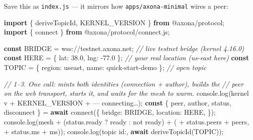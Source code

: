 \documentclass[
  nobib]{tufte-handout}
\newenvironment{Shaded}{}{}
\newcommand{\AttributeTok}[1]{\textcolor[rgb]{0.49,0.56,0.16}{#1}}
\newcommand{\BuiltInTok}[1]{\textcolor[rgb]{0.00,0.50,0.00}{#1}}
\newcommand{\CommentTok}[1]{\textcolor[rgb]{0.38,0.63,0.69}{\textit{#1}}}
\newcommand{\ControlFlowTok}[1]{\textcolor[rgb]{0.00,0.44,0.13}{\textbf{#1}}}
\newcommand{\DataTypeTok}[1]{\textcolor[rgb]{0.56,0.13,0.00}{#1}}
\newcommand{\FloatTok}[1]{\textcolor[rgb]{0.25,0.63,0.44}{#1}}
\newcommand{\FunctionTok}[1]{\textcolor[rgb]{0.02,0.16,0.49}{#1}}
\newcommand{\ImportTok}[1]{\textcolor[rgb]{0.00,0.50,0.00}{\textbf{#1}}}
\newcommand{\KeywordTok}[1]{\textcolor[rgb]{0.00,0.44,0.13}{\textbf{#1}}}
\newcommand{\NormalTok}[1]{#1}
\newcommand{\OperatorTok}[1]{\textcolor[rgb]{0.40,0.40,0.40}{#1}}
\newcommand{\StringTok}[1]{\textcolor[rgb]{0.25,0.44,0.63}{#1}}
\begin{document}
Save this as \texttt{index.js} --- it mirrors how
\texttt{apps/axona-minimal} wires a peer:

\begin{Shaded}
\begin{Highlighting}[]
\ImportTok{import}\NormalTok{ \{ deriveTopicId}\OperatorTok{,}\NormalTok{ KERNEL\_VERSION \} }\ImportTok{from} \StringTok{\textquotesingle{}@axona/protocol\textquotesingle{}}\OperatorTok{;}
\ImportTok{import}\NormalTok{ \{ connect \} }\ImportTok{from} \StringTok{\textquotesingle{}@axona/protocol/connect.js\textquotesingle{}}\OperatorTok{;}

\KeywordTok{const}\NormalTok{ BRIDGE }\OperatorTok{=} \StringTok{\textquotesingle{}wss://testnet.axona.net\textquotesingle{}}\OperatorTok{;}           \CommentTok{// live testnet bridge (kernel 4.16.0)}
\KeywordTok{const}\NormalTok{ HERE   }\OperatorTok{=}\NormalTok{ \{ }\DataTypeTok{lat}\OperatorTok{:} \FloatTok{38.0}\OperatorTok{,} \DataTypeTok{lng}\OperatorTok{:} \OperatorTok{{-}}\FloatTok{77.0}\NormalTok{ \}}\OperatorTok{;}           \CommentTok{// your real location (us{-}east here)}
\KeywordTok{const}\NormalTok{ TOPIC  }\OperatorTok{=}\NormalTok{ \{ }\DataTypeTok{region}\OperatorTok{:} \StringTok{\textquotesingle{}useast\textquotesingle{}}\OperatorTok{,} \DataTypeTok{name}\OperatorTok{:} \StringTok{\textquotesingle{}quick{-}start{-}demo\textquotesingle{}}\NormalTok{ \}}\OperatorTok{;}   \CommentTok{// open topic}

\CommentTok{// 1–3. One call: mints both identities (connection + author), builds the}
\CommentTok{//      peer on the web transport, starts it, and waits for the mesh to warm.}
\BuiltInTok{console}\OperatorTok{.}\FunctionTok{log}\NormalTok{(}\StringTok{\textquotesingle{}kernel v\textquotesingle{}} \OperatorTok{+}\NormalTok{ KERNEL\_VERSION }\OperatorTok{+} \StringTok{\textquotesingle{} — connecting…\textquotesingle{}}\NormalTok{)}\OperatorTok{;}
\KeywordTok{const}\NormalTok{ \{ peer}\OperatorTok{,}\NormalTok{ author}\OperatorTok{,}\NormalTok{ status}\OperatorTok{,}\NormalTok{ disconnect \} }\OperatorTok{=} \ControlFlowTok{await} \FunctionTok{connect}\NormalTok{(\{}
  \DataTypeTok{bridge}\OperatorTok{:}\NormalTok{   BRIDGE}\OperatorTok{,}
  \DataTypeTok{location}\OperatorTok{:}\NormalTok{ HERE}\OperatorTok{,}
\NormalTok{\})}\OperatorTok{;}
\BuiltInTok{console}\OperatorTok{.}\FunctionTok{log}\NormalTok{(}\StringTok{\textquotesingle{}mesh \textquotesingle{}} \OperatorTok{+}\NormalTok{ (status}\OperatorTok{.}\AttributeTok{ready} \OperatorTok{?} \StringTok{\textquotesingle{}ready\textquotesingle{}} \OperatorTok{:} \StringTok{\textquotesingle{}not ready\textquotesingle{}}\NormalTok{) }\OperatorTok{+} \StringTok{\textquotesingle{} (\textquotesingle{}} \OperatorTok{+}\NormalTok{ status}\OperatorTok{.}\AttributeTok{peers} \OperatorTok{+} \StringTok{\textquotesingle{} peers, \textquotesingle{}} \OperatorTok{+}\NormalTok{ status}\OperatorTok{.}\AttributeTok{ms} \OperatorTok{+} \StringTok{\textquotesingle{}ms)\textquotesingle{}}\NormalTok{)}\OperatorTok{;}
\BuiltInTok{console}\OperatorTok{.}\FunctionTok{log}\NormalTok{(}\StringTok{\textquotesingle{}topic id:\textquotesingle{}}\OperatorTok{,} \ControlFlowTok{await} \FunctionTok{deriveTopicId}\NormalTok{(TOPIC))}\OperatorTok{;}


\end{Highlighting}
\end{Shaded}
\end{document}
